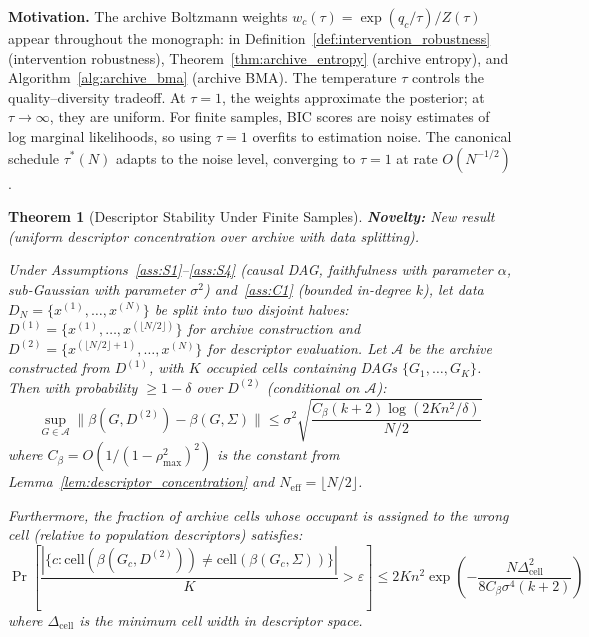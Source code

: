 \documentclass{article}
\theoremstyle{definition}
\theoremstyle{plain}
\newtheorem{theorem}{Theorem}
\theoremstyle{remark}
\begin{document}
\textbf{Motivation.} The archive Boltzmann weights $w_c(\tau) = \exp(q_c/\tau)/Z(\tau)$ appear
throughout the monograph: in Definition~\ref{def:intervention_robustness} (intervention
robustness), Theorem~\ref{thm:archive_entropy} (archive entropy), and
Algorithm~\ref{alg:archive_bma} (archive BMA). The temperature $\tau$ controls the
quality--diversity tradeoff. At $\tau = 1$, the weights approximate the posterior; at
$\tau \to \infty$, they are uniform. For finite samples, BIC scores are noisy estimates of
log marginal likelihoods, so using $\tau = 1$ overfits to estimation noise. The canonical
schedule $\tau^*(N)$ adapts to the noise level, converging to $\tau = 1$ at rate
$O(N^{-1/2})$.

\begin{theorem}[Descriptor Stability Under Finite Samples]
\label{thm:descriptor_stability}
\textbf{Novelty:} New result (uniform descriptor concentration over archive with data splitting).

Under Assumptions~\ref{ass:S1}--\ref{ass:S4} (causal DAG, faithfulness with parameter $\alpha$,
sub-Gaussian with parameter $\sigma^2$) and~\ref{ass:C1} (bounded in-degree $k$), let data
$D_N = \{x^{(1)}, \ldots, x^{(N)}\}$ be split into two disjoint halves:
$D^{(1)} = \{x^{(1)}, \ldots, x^{(\lfloor N/2 \rfloor)}\}$ for archive construction and
$D^{(2)} = \{x^{(\lfloor N/2 \rfloor + 1)}, \ldots, x^{(N)}\}$ for descriptor evaluation.
Let $\mathcal{A}$ be the archive constructed from $D^{(1)}$, with $K$ occupied cells
containing DAGs $\{G_1, \ldots, G_K\}$. Then with probability $\geq 1 - \delta$ over
$D^{(2)}$ (conditional on $\mathcal{A}$):
\begin{equation}
  \sup_{G \in \mathcal{A}} \|\beta(G, D^{(2)}) - \beta(G, \Sigma)\|
  \leq \sigma^2\sqrt{\frac{C_\beta(k+2)\log(2Kn^2/\delta)}{N/2}}
\end{equation}
where $C_\beta = O(1/(1 - \rho_{\max}^2)^2)$ is the constant from
Lemma~\ref{lem:descriptor_concentration} and $N_{\mathrm{eff}} = \lfloor N/2 \rfloor$.

Furthermore, the fraction of archive cells whose occupant is assigned to the wrong cell
(relative to population descriptors) satisfies:
\begin{equation}
  \Pr\!\left[\frac{|\{c : \mathrm{cell}(\beta(G_c, D^{(2)})) \neq
  \mathrm{cell}(\beta(G_c, \Sigma))\}|}{K} > \varepsilon\right]
  \leq 2Kn^2\exp\!\left(-\frac{N \Delta_{\mathrm{cell}}^2}{8C_\beta\sigma^4(k+2)}\right)
\end{equation}
where $\Delta_{\mathrm{cell}}$ is the minimum cell width in descriptor space.
\end{theorem}
\end{document}
